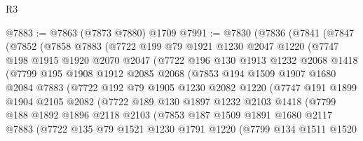 \begin{lexlean}{R3}
\begin{coremodule}
@7883 := @7863 (@7873 @7880) @1709
@7991 := @7830
    (@7836
      (@7841
        (@7847
          (@7852
            (@7858
              @7883
              (@7722
                @199
                @79
                @1921
                @1230
                @2047
                @1220
                (@7747
                  @198
                  @1915
                  @1920
                  @2070
                  @2047
                  (@7722
                    @196
                    @130
                    @1913
                    @1232
                    @2068
                    @1418
                    (@7799
                      @195
                      @1908
                      @1912
                      @2085
                      @2068
                      (@7853
                        @194
                        @1509
                        @1907
                        @1680
                        @2084
                        @7883
                        (@7722
                          @192
                          @79
                          @1905
                          @1230
                          @2082
                          @1220
                          (@7747
                            @191
                            @1899
                            @1904
                            @2105
                            @2082
                            (@7722
                              @189
                              @130
                              @1897
                              @1232
                              @2103
                              @1418
                              (@7799
                                @188
                                @1892
                                @1896
                                @2118
                                @2103
                                (@7853
                                  @187
                                  @1509
                                  @1891
                                  @1680
                                  @2117
                                  @7883
                                  (@7722
                                    @135
                                    @79
                                    @1521
                                    @1230
                                    @1791
                                    @1220
                                    (@7799
                                      @134
                                      @1511
                                      @1520

\end{coremodule}
\end{lexlean}
